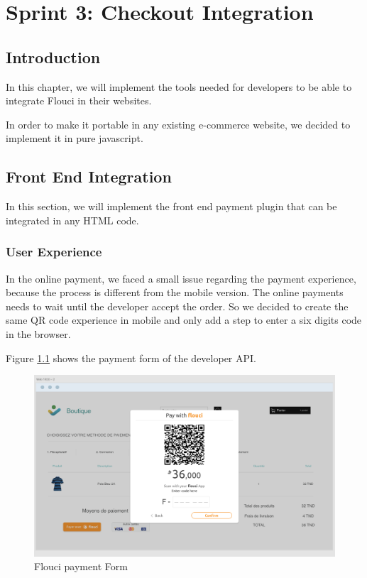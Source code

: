 
\setcounter{chapter}{4}
\chapter{Sprint 3: Checkout Integration}
\minitoc %
\graphicspath{{Chapter5/figures/}}

\pagestyle{fancy}
\fancyhf{}
\fancyhead[R]{\bfseries\rightmark}
\fancyfoot[R]{\thepage}
\renewcommand{\headrulewidth}{0.5pt}
\renewcommand{\footrulewidth}{0pt}
\renewcommand{\chaptermark}[1]{\markboth{\MakeUppercase{\chaptername~\thechapter. #1 }}{}}
\renewcommand{\sectionmark}[1]{\markright{\thechapter.\thesection~ #1}}


\begin{spacing}{1.2}

\section*{Introduction}
In this chapter, we will implement the tools needed for developers to be able to integrate Flouci in their websites.

In order to make it portable in any existing e-commerce website, we decided to implement it in pure javascript.
\section{Front End Integration}
In this section, we will implement the front end payment plugin that  can be integrated in any HTML code.
\subsection{User Experience}
In the online payment, we faced a small issue regarding the payment experience, because the process is different from the mobile version. The online payments needs to wait until the developer accept the order.
So we decided to create the same QR code experience in mobile and only add a step to enter a six digits code in the browser.

Figure \ref{fig:onlinepay} shows the payment form of the developer API.
\begin{figure}[H]\centering
\includegraphics[width= \textwidth, keepaspectratio ]{Checkout_screen.png}
\caption{Flouci payment Form}
\label{fig:onlinepay}
\end{figure}


\end{spacing}

